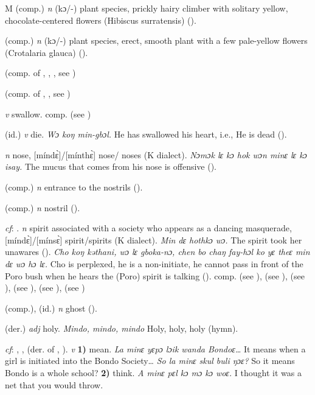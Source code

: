 \begin{letter}{M}
 (comp.) \textit{n} (kɔ/-) plant species, prickly hairy climber with solitary yellow, chocolate-centered flowers (Hibiscus surratensis) (\citealt{Pichl1967}). 

 (comp.) \textit{n} (kɔ/-) plant species, erect, smooth plant with a few pale-yellow flowers (Crotalaria glauca) (\citealt{Pichl1967}).

 (comp. of , , , see ) 

 (comp. of , , see ) 

 \textit{v} swallow. comp.  (see ) 

 (id.) \textit{v} die. \textit{Wɔ koŋ min-gbɔl.} He has swallowed his heart, i.e., He is dead (\citealt{Pichl1967}). 

 \textit{n} nose, [míndɛ̀]/[mínthɛ̀] nose/ noses (K dialect). \textit{Nɔmɔk lɛ kɔ hok wɔn minɛ lɛ kɔ isay.} The mucus that comes from his nose is offensive (\citealt{Pichl1967}). 

 (comp.) \textit{n} entrance to the nostrils (\citealt{Pichl1967}).

 (comp.) \textit{n} nostril (\citealt{Pichl1967}). 

 \textit{cf}: . \textit{n} spirit associated with a society who appears as a dancing masquerade, [míndɛ̀]/[mínsɛ̀] spirit/spirits (K dialect). \textit{Min dɛ hothkɔ wɔ.} The spirit took her unawares (\citealt{Pichl1967}). \textit{Cho koŋ kəthani, wɔ lɛ gboka-nɔ, chen bo chaŋ fay-hɔl ko yɛ theɛ min dɛ wɔ hɔ lɛ.} Cho is perplexed, he is a non-initiate, he cannot pass in front of the Poro bush when he hears the (Poro) spirit is talking (\citealt{Pichl1967}). comp.  (see ),  (see ),  (see ),  (see ),  (see ),  (see ) 

 (comp.), (id.) \textit{n} ghost (\citealt{Pichl1967}).

 (der.) \textit{adj} holy. \textit{Mindo, mindo, mindo} Holy, holy, holy (hymn).

 \textit{cf}: , ,  (der. of , ). \textit{v} \textbf{1)} mean. \textit{La minɛ yɛpɔ lɔik wanda Bondoɛ…} It means when a girl is initiated into the Bondo Society… \textit{So la minɛ skul buli ŋɔɛ?} So it means Bondo is a whole school? \textbf{2)} think. \textit{A minɛ pɛl kɔ mɔ kɔ woɛ.} I thought it was a net that you would throw.


\end{letter}
